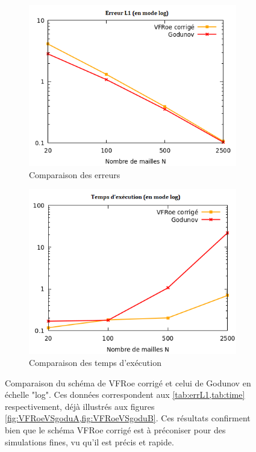 \documentclass[
	french,
	11pt, %
]{fphw}
\begin{document}
\begin{figure}[H]
	\centering
	\begin{subfigure}[b]{0.4\textwidth}
		\centering
		\includegraphics[width=\textwidth]{VFRoeVSgoduERRLOG.png}
		\caption{Comparaison des erreurs}
	\end{subfigure}
	\begin{subfigure}[b]{0.4\textwidth}
		\centering
		\includegraphics[width=\textwidth]{VFRoeVSgoduTIMELOG.png}
		\caption{Comparaison des temps d'exécution}
	\end{subfigure}
	\caption{Comparaison du schéma de VFRoe corrigé et celui de Godunov en échelle "log". Ces données correspondent aux \cref{tab:errL1,tab:time} respectivement, déjà illustrés aux figures \cref{fig:VFRoeVSgoduA,fig:VFRoeVSgoduB}. Ces résultats confirment bien que le schéma VFRoe corrigé est à préconiser pour des simulations fines, vu qu'il est précis et rapide.}
	\label{fig:VFRoeVSgodu}
\end{figure}
\end{document}
